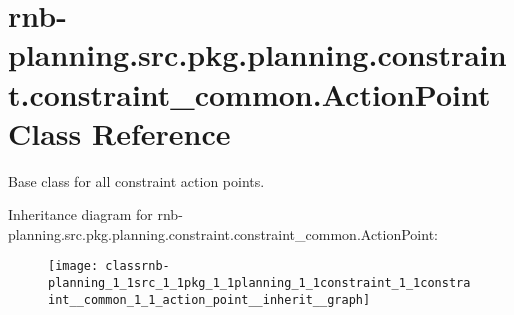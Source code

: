 \hypertarget{classrnb-planning_1_1src_1_1pkg_1_1planning_1_1constraint_1_1constraint__common_1_1_action_point}{}\section{rnb-\/planning.src.\+pkg.\+planning.\+constraint.\+constraint\+\_\+common.\+Action\+Point Class Reference}
\label{classrnb-planning_1_1src_1_1pkg_1_1planning_1_1constraint_1_1constraint__common_1_1_action_point}


Base class for all constraint action points.  




Inheritance diagram for rnb-\/planning.src.\+pkg.\+planning.\+constraint.\+constraint\+\_\+common.\+Action\+Point\+:
\nopagebreak
\begin{figure}[H]
\begin{center}
\leavevmode
\texttt{[image: classrnb-planning\_1\_1src\_1\_1pkg\_1\_1planning\_1\_1constraint\_1\_1constraint\_\_common\_1\_1\_action\_point\_\_inherit\_\_graph]}
\end{center}
\end{figure}
